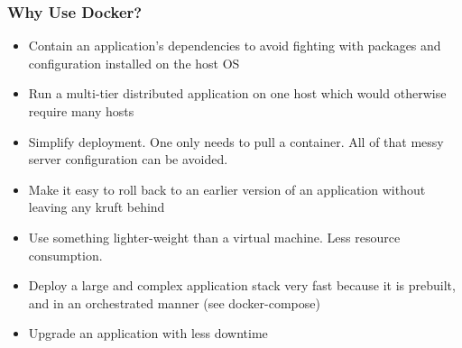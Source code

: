 \documentclass[helvetica,english,utf8,notitle,nologo]{beamer}
\begin{document}
\begin{frame}
  \frametitle{Why Use Docker?}

  \begin{itemize}
  \item Contain an application's dependencies to avoid fighting with
    packages and configuration installed on the host OS
  \item Run a multi-tier distributed application on one host which
    would otherwise require many hosts
  \item Simplify deployment. One only needs to pull a container. All
    of that messy server configuration can be avoided.
  \item Make it easy to roll back to an earlier version of an
    application without leaving any kruft behind
  \item Use something lighter-weight than a virtual machine. Less
    resource consumption.
  \item Deploy a large and complex application stack very fast because
    it is prebuilt, and in an orchestrated manner (see docker-compose)
  \item Upgrade an application with less downtime
  \end{itemize}

\end{frame}
\end{document}
